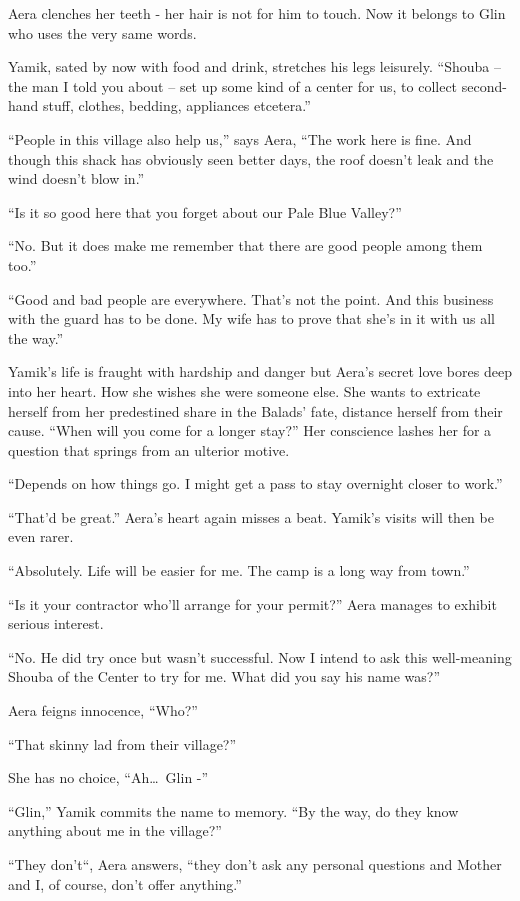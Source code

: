 \documentclass[twoside,11pt]{book}
\begin{document}
Aera clenches her teeth - her hair is not for him to touch. Now it belongs to Glin who uses the very same words. 

Yamik, sated by now with food and drink, stretches his legs leisurely. ``Shouba -- the man I told you about -- set up
some kind of a center for us, to collect second-hand stuff, clothes, bedding, appliances etcetera.''

``People in this village also help us,'' says Aera, ``The work here is fine. And though this shack has obviously seen
better days, the roof doesn't leak and the wind doesn't blow in.''

``Is it so good here that you forget about our Pale Blue Valley?''

``No. But it does make me remember that there are good people among them too.''

``Good and bad people are everywhere. That's not the point. And this business with the guard has to be done. My wife
has to prove that she's in it with us all the way.''

Yamik's life is fraught with hardship and danger but Aera's secret love bores deep into her heart. How she wishes she
were someone else. She wants to extricate herself from her predestined share in the Balads' fate, distance herself from
their cause. ``When will you come for a longer stay?'' Her conscience lashes her for a question that springs from an
ulterior motive.

``Depends on how things go. I might get a pass to stay overnight closer to work.''

``That'd be great.'' Aera's heart again misses a beat. Yamik's visits will then be even rarer.

``Absolutely. Life will be easier for me. The camp is a long way from town.''

``Is it your contractor who'll arrange for your permit?'' Aera manages to exhibit serious interest.

``No. He did try once but wasn't successful. Now I intend to ask this well-meaning Shouba of the Center to try for me.
What did you say his name was?''

Aera feigns innocence, ``Who?'' 

``That skinny lad from their village?''

She has no choice, ``Ah\dots\ Glin -''

``Glin,'' Yamik commits the name to memory. ``By the way, do they know anything about me in the
village?''

``They don't``, Aera answers, ``they don't ask any personal questions and Mother
and I, of course, don't offer anything.''
\end{document}
